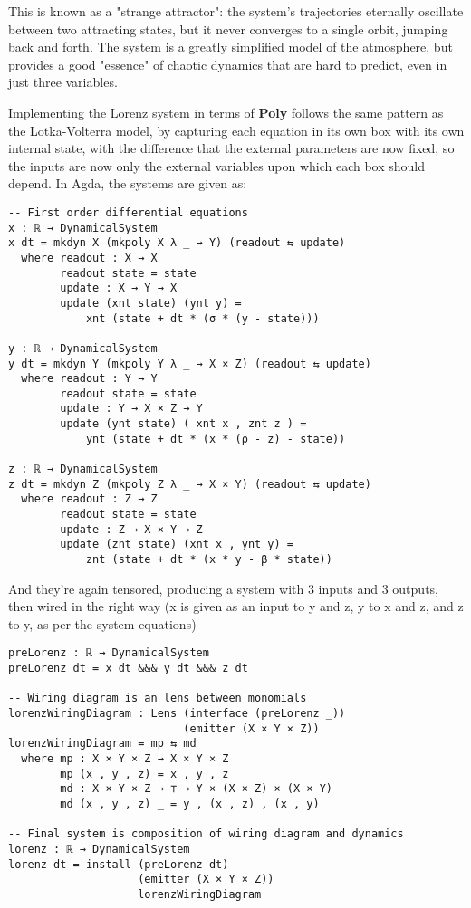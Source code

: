 This is known as a "strange attractor": the system's trajectories eternally oscillate between two attracting states, but it never converges to a single orbit, jumping back and forth. The system is a greatly simplified model of the atmosphere, but provides a good "essence" of chaotic dynamics that are hard to predict, even in just three variables. 

Implementing the Lorenz system in terms of \textbf{Poly} follows the same pattern as the Lotka-Volterra model, by capturing each equation in its own box with its own internal state, with the difference that the external parameters are now fixed, so the inputs are now only the external variables upon which each box should depend. In Agda, the systems are given as:
\begin{verbatim}
-- First order differential equations
x : ℝ → DynamicalSystem
x dt = mkdyn X (mkpoly X λ _ → Y) (readout ⇆ update)
  where readout : X → X
        readout state = state
        update : X → Y → X
        update (xnt state) (ynt y) = 
            xnt (state + dt * (σ * (y - state)))

y : ℝ → DynamicalSystem
y dt = mkdyn Y (mkpoly Y λ _ → X × Z) (readout ⇆ update)
  where readout : Y → Y
        readout state = state
        update : Y → X × Z → Y
        update (ynt state) ( xnt x , znt z ) = 
            ynt (state + dt * (x * (ρ - z) - state))

z : ℝ → DynamicalSystem
z dt = mkdyn Z (mkpoly Z λ _ → X × Y) (readout ⇆ update)
  where readout : Z → Z
        readout state = state
        update : Z → X × Y → Z
        update (znt state) (xnt x , ynt y) = 
            znt (state + dt * (x * y - β * state))
\end{verbatim}
And they're again tensored, producing a system with 3 inputs and 3 outputs, then wired in the right way (x is given as an input to y and z, y to x and z, and z to y, as per the system equations)

\begin{verbatim}
preLorenz : ℝ → DynamicalSystem
preLorenz dt = x dt &&& y dt &&& z dt

-- Wiring diagram is an lens between monomials
lorenzWiringDiagram : Lens (interface (preLorenz _))
                           (emitter (X × Y × Z))
lorenzWiringDiagram = mp ⇆ md
  where mp : X × Y × Z → X × Y × Z
        mp (x , y , z) = x , y , z
        md : X × Y × Z → ⊤ → Y × (X × Z) × (X × Y)
        md (x , y , z) _ = y , (x , z) , (x , y)

-- Final system is composition of wiring diagram and dynamics
lorenz : ℝ → DynamicalSystem
lorenz dt = install (preLorenz dt)
                    (emitter (X × Y × Z))
                    lorenzWiringDiagram
\end{verbatim}

